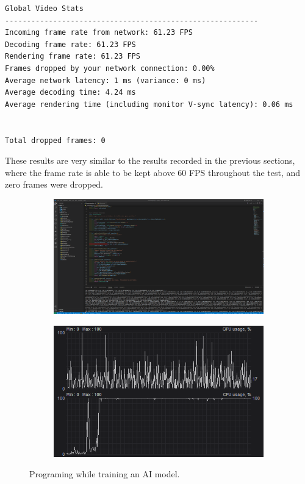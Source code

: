 \begin{lstlisting}[style=plaintext,title=Statistics recorded while streaming KiCad (Figure \ref{fig:RealWorldKicad})]
Global Video Stats
----------------------------------------------------------
Incoming frame rate from network: 61.23 FPS
Decoding frame rate: 61.23 FPS
Rendering frame rate: 61.23 FPS
Frames dropped by your network connection: 0.00%
Average network latency: 1 ms (variance: 0 ms)
Average decoding time: 4.24 ms
Average rendering time (including monitor V-sync latency): 0.06 ms


Total dropped frames: 0
\end{lstlisting}

These results are very similar to the results recorded in the previous sections, where the frame rate is able to be kept above 60 FPS throughout the test, and zero frames were dropped.

\begin{figure}[t]
  \centering
  \begin{subfigure}{1\textwidth}
    \centering
    \includegraphics[width=.9\linewidth]{Figures/realworld/ai}
  \end{subfigure}
  \begin{subfigure}{1\textwidth}
    \centering
    \includegraphics[width=.5\linewidth]{Figures/realworld/aistats}
  \end{subfigure}
  \caption[Streaming the training of an AI]{Programing while training an AI model.}
  \label{fig:RealWorldAI}
\end{figure}

